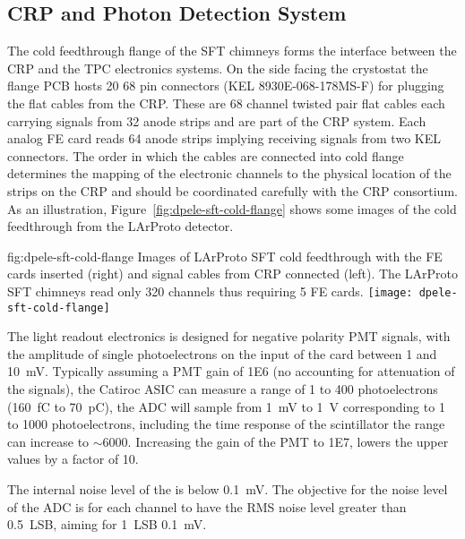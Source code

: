 \subsection{CRP and Photon Detection System}
\label{sec:fddp-tpc-elec-intfc-crppmt}

The cold feedthrough flange of the SFT chimneys forms the interface between the CRP and the TPC electronics systems. On the side facing the crystostat the flange PCB hosts \num{20} \num{68} pin connectors (KEL 8930E-068-178MS-F) for plugging the flat cables from the CRP. These are 68 channel twisted pair flat cables each carrying signals from \num{32} anode strips and are part of the CRP system. Each analog FE card reads \num{64} anode strips implying receiving signals from two KEL connectors. The order in which the cables are connected into cold flange determines the mapping of the electronic channels to the physical location of the strips on the CRP and should be coordinated carefully with the CRP consortium. As an illustration, Figure~\ref{fig:dpele-sft-cold-flange} shows some images of the cold feedthrough from the LArProto detector.

\begin{dunefigure}{fig:dpele-sft-cold-flange}
{Images of LArProto SFT cold feedthrough with the FE cards inserted (right) and signal cables from CRP connected (left). The LArProto SFT chimneys read only \num{320} channels thus requiring \num{5} FE cards.}
\texttt{[image: dpele-sft-cold-flange]}
\end{dunefigure}

The light readout electronics is designed for negative polarity PMT signals, with the amplitude of single photoelectrons on the input of the card between \num{1} and \SI{10}{\milli\volt}. Typically assuming a PMT gain of \num{1E6} (no accounting for attenuation of the signals), the Catiroc ASIC can measure a range of \num{1} to \num{400} photoelectrons (\SI{160}{\femto\coulomb} to \SI{70}{\pico\coulomb}), the ADC will sample from \SI{1}{\milli\volt} to \SI{1}{\volt} corresponding to \num{1} to \num{1000} photoelectrons, including the time response of the scintillator the range can increase to $\sim$\num{6000}. Increasing the gain of the PMT to \num{1E7}, lowers the upper values by a factor of 10.

The internal noise level of the  is below \SI{0.1}{\milli\volt}. The objective for the noise level of the ADC is for each channel to have the RMS noise level greater than \SI{0.5}{LSB}, aiming for \SI{1}{LSB} \SI{0.1}{\milli\volt}.

